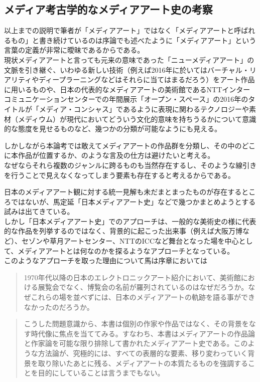 \documentclass[a4paper,report]{jsbook}
\begin{document}
\subsection{メディア考古学的なメディアアート史の考察}\label{ux30e1ux30c7ux30a3ux30a2ux8003ux53e4ux5b66ux7684ux306aux30e1ux30c7ux30a3ux30a2ux30a2ux30fcux30c8ux53f2ux306eux8003ux5bdf}

以上までの説明で筆者が「メディアアート」ではなく「メディアアートと呼ばれるもの」と書き続けているのは序論でも述べたように「メディアアート」という言葉の定義が非常に曖昧であるからである。\\
現状メディアアートと言っても元来の意味であった「ニューメディアアート」の文脈を引き継ぐ、いわゆる新しい技術（例えば2016年に於いてはバーチャル・リアリティやディープラーニングなどはそれらに当てはまるだろう）をアート作品に用いるものや、日本の代表的なメディアアートの美術館であるNTTインターコミュニケーションセンターでの年間展示「オープン・スペース」の2016年のタイトルが「メディア・コンシャス」であるように表現に関わるテクノロジーや素材（メディウム）が現代においてどういう文化的意味を持ちうるかについて意識的な態度を見せるものなど、幾つかの分類が可能なようにも見える。

しかしながら本論考では敢えてメディアアートの作品群を分類し、その中のどこに本作品が位置するか、のような言及の仕方は避けたいと考える。\\
なぜならそれら複数のジャンルに跨るものも当然存在するし、そのような線引きを行うことで見えなくなってしまう要素も存在すると考えるからである。

日本のメディアアート観に対する統一見解も未だまとまったものが存在するところではないが、馬定延「日本メディアアート史」などで幾つかまとめようとする試みは出てきている。\\
しかし「日本メディアアート史」でのアプローチは、一般的な美術史の様に代表的な作品を列挙するのではなく、背景的に起こった出来事（例えば大阪万博など）、セゾンや草月アートセンター、NTTのICCなど舞台となった場を中心として、メディアアートとは何なのかを探るようなアプローチとなっている。\\
このようなアプローチを取った理由について馬は序章においては

\begin{quote}
1970年代以降の日本のエレクトロニックアート紹介において、美術館における展覧会でなく、博覧会の名前が羅列されているのはなぜだろうか。なぜこれらの場を並べずには、日本のメディアアートの軌跡を語る事ができなかったのだろうか。
\end{quote}

\begin{quote}
こうした問題意識から、本書は個別の作家や作品ではなく、その背景をなす時代像に焦点を当ててみる。すなわち、本書はメディアアートの作品論と作家論を可能な限り排除して書かれたメディアアート史である。このような方法論が、究極的には、すべての表層的な要素、移り変わっていく背景を取り除いたあとに残る、メディアアートの本質たるものを強調することを目的にしていることは言うまでもない。
\end{quote}
\end{document}
